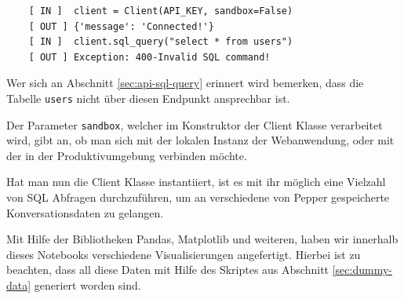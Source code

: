 \begin{lstlisting}
    [ IN ]  client = Client(API_KEY, sandbox=False)
    [ OUT ] {'message': 'Connected!'}
    [ IN ]  client.sql_query("select * from users")
    [ OUT ] Exception: 400-Invalid SQL command!
\end{lstlisting}

Wer sich an Abschnitt \ref{sec:api-sql-query} erinnert wird bemerken, dass die Tabelle \verb|users| nicht über diesen Endpunkt ansprechbar ist.

Der Parameter \verb|sandbox|, welcher im Konstruktor der Client Klasse verarbeitet wird, gibt an, ob man sich mit der lokalen Instanz der Webanwendung, oder mit der in der Produktivumgebung verbinden möchte.

Hat man nun die Client Klasse instantiiert, ist es mit ihr möglich eine Vielzahl von SQL Abfragen durchzuführen, um an verschiedene von Pepper gespeicherte Konversationsdaten zu gelangen.

Mit Hilfe der Bibliotheken Pandas, Matplotlib und weiteren, haben wir innerhalb dieses Notebooks verschiedene Visualisierungen angefertigt. Hierbei ist zu beachten, dass all diese Daten mit Hilfe des Skriptes aus Abschnitt \ref{sec:dummy-data} generiert worden sind.\\

